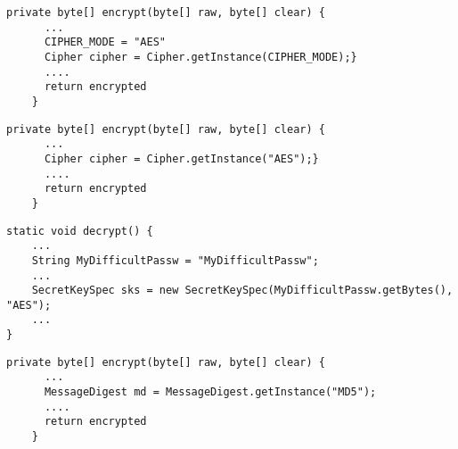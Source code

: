 \begin{lstlisting}[caption={A real code snippet taken from Stackoverflow. I want to build a tool which after analyzing the code snippet will highlight the part of the code that is insecure and suggest an alternative secure implementation as showed in the figure.}, label={fig:motivating-example}]
    private byte[] encrypt(byte[] raw, byte[] clear) {
      ...
      CIPHER_MODE = "AES"
      Cipher cipher = Cipher.getInstance(CIPHER_MODE);}
      ....
      return encrypted
    }
     \end{lstlisting}

\begin{lstlisting}[caption={A real code snippet taken from Stackoverflow. I want to build a tool which after analyzing the code snippet will highlight the part of the code that is insecure and suggest an alternative secure implementation as showed in the figure.}, label={fig:motivating-example}]
    private byte[] encrypt(byte[] raw, byte[] clear) {
      ...
      Cipher cipher = Cipher.getInstance("AES");}
      ....
      return encrypted
    }
     \end{lstlisting}

\begin{lstlisting}[caption={A real code snippet taken from Stackoverflow. I want to build a tool which after analyzing the code snippet will highlight the part of the code that is insecure and suggest an alternative secure implementation as showed in the figure.}, label={fig:motivating-example}]
static void decrypt() {
    ...
    String MyDifficultPassw = "MyDifficultPassw";
    ...  
    SecretKeySpec sks = new SecretKeySpec(MyDifficultPassw.getBytes(), "AES");
    ...
}
\end{lstlisting}
\begin{lstlisting}[caption={A real code snippet taken from Stackoverflow. I want to build a tool which after analyzing the code snippet will highlight the part of the code that is insecure and suggest an alternative secure implementation as showed in the figure.}, label={fig:motivating-example}]
    private byte[] encrypt(byte[] raw, byte[] clear) {
      ...
      MessageDigest md = MessageDigest.getInstance("MD5");
      ....
      return encrypted
    }
\end{lstlisting}
